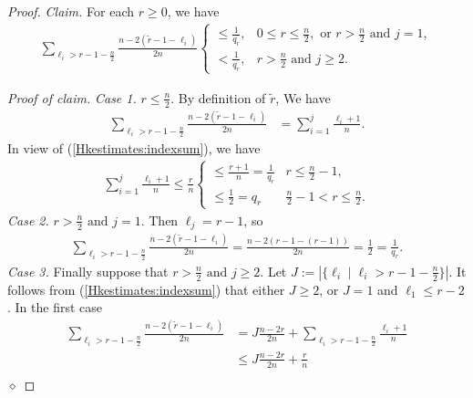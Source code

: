 \documentclass[12pt]{amsart}
\renewcommand{\1}{{\mathbf 1}}
\newenvironment{claim}{\par\medskip\noindent\textit{Claim.}\space}{\par\medskip}
\newenvironment{claimproof}{\par\noindent\textit{Proof of claim.}\space}{\hfill$\diamond$\medskip\par}
\theoremstyle{others}
\numberwithin{equation}{section}
\begin{document}
\begin{proof}
     \begin{claim}
     For each \(r \geq 0\), we have
    \begin{align}\label{Hkestimates:sumclaim}
        \sum_{\ell_i > r-1- \frac{n}{2}} \frac{n-2(\tilde{r}-1 - \ell_i)}{2n}
        \begin{cases}
            \leq \frac{1}{q_r}, & 0 \leq r \leq \frac{n}{2}, \text{ or } r > \frac{n}{2} \text{ and } j = 1, \\
            < \frac{1}{q_r}, & r > \frac{n}{2} \text{ and } j \geq 2.
        \end{cases}
    \end{align}
    \end{claim}
    \begin{claimproof}
    \emph{Case 1.} \(r \leq \frac{n}{2}\). By definition of \(\tilde{r}\), We have
    \begin{align*}
        \sum_{\ell_i > r - 1 - \frac{n}{2}} \frac{n-2(\tilde{r}-1 - \ell_i)}{2n} & = \sum_{i = 1}^j \frac{\ell_i+1}{n}.
    \end{align*}
    In view of (\ref{Hkestimates:indexsum}), we have 
        \begin{align*}
        \sum_{i = 1}^j \frac{\ell_i+1}{n} \leq \frac{r}{n} 
        \begin{cases}
            \leq \frac{r+1}{n} = \frac{1}{q_r} & r \leq \frac{n}{2}- 1, \\
            \leq \frac{1}{2} = q_r & \frac{n}{2}-1 < r \leq \frac{n}{2}.
        \end{cases}
    \end{align*}
        \emph{Case 2.} \(r > \frac{n}{2} \text{ and } j = 1\). Then \(\ell_j = r-1\), so
    \begin{align*}
        \sum_{\ell_i > r - 1 - \frac{n}{2}} \frac{n-2(\tilde{r}-1-\ell_i)}{2n} = \frac{n-2(r-1-(r-1))}{2n} = \frac{1}{2} = \frac{1}{q_r}.
    \end{align*}
    \emph{Case 3.} Finally suppose that \(r > \frac{n}{2} \text{ and } j \geq 2\). Let \(J := |\{\ell_i \mid \ell_i >  r - 1 - \frac{n}{2}\}|\). It follows from (\ref{Hkestimates:indexsum}) that either \(J \geq 2\), or \(J = 1\) and \(\ell_1 \leq r-2\). In the first case
    \begin{align*}
         \sum_{\ell_i  > r - 1 - \frac{n}{2}} \frac{n-2(\tilde{r}-1-\ell_i)}{2n} &= J\frac{n-2r}{2n} + \sum_{\ell_i  > r - 1 - \frac{n}{2}} \frac{\ell_i+1}{n}  \\
         &\leq J\frac{n-2r}{2n} + \frac{r}{n} \\

\end{align*}
\end{claimproof}
\end{proof}
\end{document}
